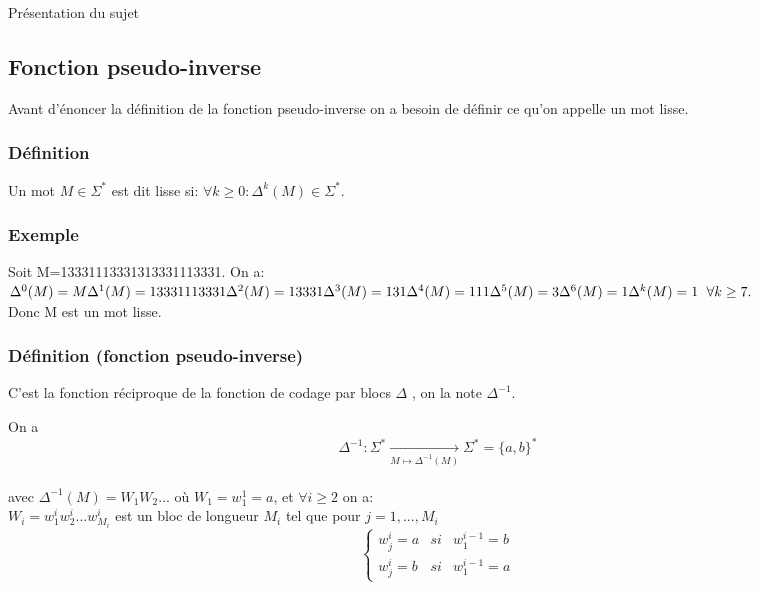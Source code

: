 \documentclass[12pt,a4paper,oneside]{book}
\begin{document}
\begin{titlepage}
\begin{chapter}{Présentation du sujet}
\subsection{Fonction pseudo-inverse}
\par Avant d'énoncer la définition de la fonction pseudo-inverse on a besoin de définir ce qu'on appelle un mot lisse.
\subsubsection*{Définition}
\par Un mot $M \in \Sigma^*$ est dit lisse si: $\forall k \geq 0:\Delta^k(M) \in \Sigma^*$.
\subsubsection*{Exemple}
\par Soit M=13331113331313331113331. On a:\\
$ \Delta^0(M)=M\\
\Delta^1(M)=13331113331\\
\Delta^2(M)=13331\\
\Delta^3(M)=131\\
\Delta^4(M)=111\\
\Delta^5(M)=3\\
\Delta^6(M)=1\\
\Delta^k(M)=1\hspace{0,5\baselineskip} \forall k \geq 7.$\\
Donc M est un mot lisse.
\subsubsection*{Définition (fonction pseudo-inverse)} 
\par C'est la fonction réciproque de la fonction de codage par blocs $\Delta$ , on la note $\Delta^{-1}$.
\par On a \\ \[ \Delta^{-1}: \Sigma^* \underset{M \longmapsto \Delta^{-1}(M)}{\longrightarrow} \Sigma^*=\{a,b\}^* \]\\
avec $\Delta^{-1}(M)= W_1 W_2 ...$ où $W_1=w_1^1=a$, et $\forall i \geq 2$ on a: \\ $ W_i=w_1^iw_2^i...w_{M_i}^i$ est un bloc de longueur $M_i$ tel que pour $j=1,...,M_{i}$ \\
\[
\left\{ \begin{array}{lll} 
w_j^i = a & si & w_1^{i-1} = b \\
w_j^i = b & si & w_1^{i-1} = a
\end{array} 
\]

\end{chapter}
\end{titlepage}
\end{document}
